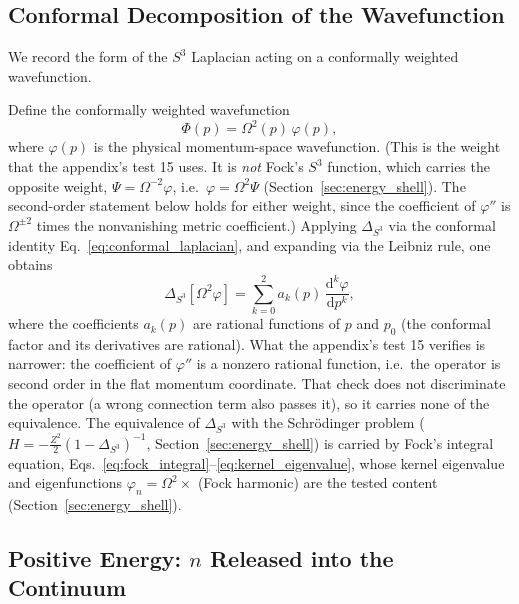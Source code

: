 \documentclass[aps,pra,twocolumn,superscriptaddress,longbibliography]{revtex4-2}
\begin{document}
\subsection{Conformal Decomposition of the Wavefunction}

We record the form of the $S^3$ Laplacian acting on a conformally weighted wavefunction.

Define the conformally weighted wavefunction
\begin{equation}
\Phi(p) = \Omega^2(p)\,\varphi(p),
\label{eq:conformal_wf}
\end{equation}
where $\varphi(p)$ is the physical momentum-space wavefunction. (This is the weight that the appendix's test 15 uses. It is \emph{not} Fock's $S^3$ function, which carries the opposite weight, $\Psi = \Omega^{-2}\varphi$, i.e.\ $\varphi = \Omega^2\Psi$ (Section~\ref{sec:energy_shell}). The second-order statement below holds for either weight, since the coefficient of $\varphi''$ is $\Omega^{\pm 2}$ times the nonvanishing metric coefficient.) Applying $\Delta_{S^3}$ via the conformal identity Eq.~\eqref{eq:conformal_laplacian}, and expanding via the Leibniz rule, one obtains
\begin{equation}
\Delta_{S^3}[\Omega^2 \varphi] = \sum_{k=0}^{2} a_k(p)\, \frac{\mathrm{d}^k \varphi}{\mathrm{d}p^k},
\label{eq:decomposition}
\end{equation}
where the coefficients $a_k(p)$ are rational functions of $p$ and $p_0$ (the conformal factor and its derivatives are rational). What the appendix's test 15 verifies is narrower: the coefficient of $\varphi''$ is a nonzero rational function, i.e.\ the operator is second order in the flat momentum coordinate. That check does not discriminate the operator (a wrong connection term also passes it), so it carries none of the equivalence. The equivalence of $\Delta_{S^3}$ with the Schr\"odinger problem ($H = -\tfrac{Z^2}{2}(1-\Delta_{S^3})^{-1}$, Section~\ref{sec:energy_shell}) is carried by Fock's integral equation, Eqs.~\eqref{eq:fock_integral}--\eqref{eq:kernel_eigenvalue}, whose kernel eigenvalue and eigenfunctions $\varphi_n = \Omega^2 \times$ (Fock harmonic) are the tested content (Section~\ref{sec:energy_shell}).


\subsection{Positive Energy: $n$ Released into the Continuum}
\label{sec:continuum}
\end{document}
